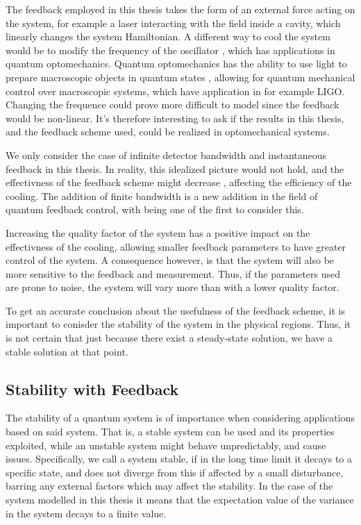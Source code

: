The feedback employed in this thesis takes the form of an external force acting on the system, for example a laser interacting with the field inside a cavity, which linearly changes the system Hamiltonian. A different way to cool the system would be to modify the frequency of the oscillator \cite{Habibi:2016}, which has applications in quantum optomechanics. Quantum optomechanics has the ability to use light to prepare macroscopic objects in quantum states \cite{Chen:2013}, allowing for quantum mechanical control over macroscopic systems, which have application in for example LIGO. Changing the frequence could prove more difficult to model since the feedback would be non-linear. It's therefore interesting to ask if the results in this thesis, and the feedback scheme used, could be realized in optomechanical systems. 

We only consider the case of infinite detector bandwidth and instantaneous feedback in this thesis. In reality, this idealized picture would not hold, and the effectivness of the feedback scheme might decrease \cite{Annby-Andersson:2024}, affecting the efficiency of the cooling. The addition of finite bandwidth is a new addition in the field of quantum feedback control, with \cite{De-Sousa:2025} being one of the first to consider this. 

Increasing the quality factor of the system has a positive impact on the effectivness of the cooling, allowing smaller feedback parameters to have greater control of the system. A consequence however, is that the system will also be more sensitive to the feedback and measurement. Thus, if the parameters used are prone to noise, the system will vary more than with a lower quality factor.

To get an accurate conclusion about the usefulness of the feedback scheme, it is important to conisder the stability of the system in the physical regions. Thus, it is not certain that just because there exist a steady-state solution, we have a stable solution at that point.



\subsection{Stability with Feedback}
The stability of a quantum system is of importance when considering applications based on said system. That is, a stable system can be used and its properties exploited, while an unstable system might behave unpredictably, and cause issues. Specifically, we call a system stable, if in the long time limit it decays to a specific state, and does not diverge from this if affected by a small disturbance, barring any external factors which may affect the stability. In the case of the system modelled in this thesis it means that the expectation value of the variance in the system decays to a finite value.


